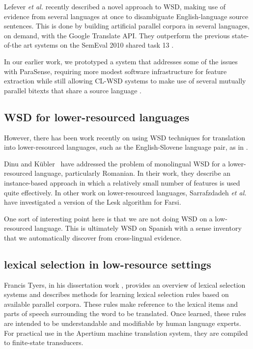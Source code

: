 Lefever \textit{et al.} recently described a novel approach to WSD, making use
of evidence from several languages at once to disambiguate English-language
source sentences. This is done by building artificial parallel corpora in
several languages, on demand, with the Google Translate API. They outperform
the previous state-of-the art systems on the SemEval 2010 shared task 13
\cite{lefever-hoste-decock:2011:ACL-HLT2011}.

In our earlier work, we prototyped a system that addresses some of the issues
with ParaSense, requiring more modest software infrastructure for feature
extraction while still allowing CL-WSD systems to make use of several mutually
parallel bitexts that share a source language
\cite{rudnick-liu-gasser:2013:SemEval-2013}.

\subsection{WSD for lower-resourced languages}
However, there has been work recently on using WSD techniques for translation
into lower-resourced languages, such as the English-Slovene language pair, as
in \cite{vintar-fivser-vrvsvcaj:2012:ESIRMT-HyTra2012}. 

Dinu and Kübler~\cite{Dinu07} have addressed the problem of monolingual WSD for
a lower-resourced language, particularly Romanian. In their work, they describe
an instance-based approach in which a relatively small number of features is
used quite effectively. In other work on lower-resourced languages,
Sarrafzdadeh \textit{et al.} have investigated a version of the Lesk algorithm
for Farsi.

One sort of interesting point here is that we are not doing WSD on a
low-resourced language. This is ultimately WSD on Spanish with a sense
inventory that we automatically discover from cross-lingual evidence.

\subsection{lexical selection in low-resource settings}
Francis Tyers, in his dissertation work \cite{tyers-dissertation},
provides an overview of lexical selection systems and describes methods for
learning lexical selection rules based on available parallel corpora. These
rules make reference to the lexical items and parts of speech surrounding the
word to be translated. Once learned, these rules are intended to be
understandable and modifiable by human language experts. For practical use in
the Apertium machine translation system, they are compiled to finite-state
transducers.

